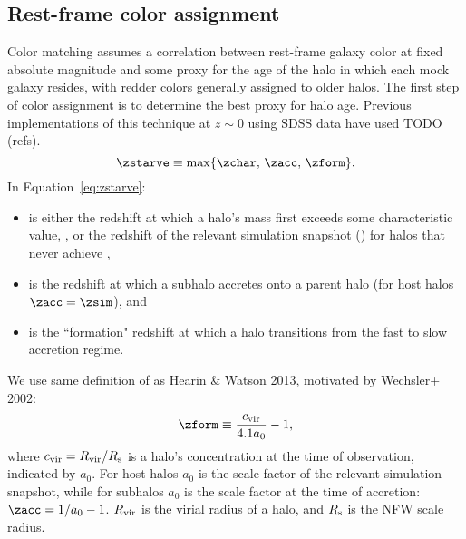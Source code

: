 \documentclass[twocolumn,apj,iop,tighten]{emulateapj2}
\begin{document}
\subsection{Rest-frame color assignment}\label{subsec:color_assign}

Color matching assumes a correlation between rest-frame galaxy color at fixed absolute magnitude and some proxy for the age of the halo in which each mock galaxy resides, with redder colors generally assigned to older halos. The first step of color assignment is to determine the best proxy for halo age. Previous implementations of this technique at $z\sim0$ using SDSS data have used TODO (refs).
%
\begin{equation}\label{eq:zstarve}
\zstarve \equiv \max\{\zchar,\, \zacc,\, \zform\}.
\end{equation}
%
\noindent In Equation~\ref{eq:zstarve}:

\begin{itemize}
\item \zchar is either the redshift at which a halo's mass first exceeds some characteristic value, \mchar, or the redshift of the relevant simulation snapshot (\zsim) for halos that never achieve \mchar,
%
\item \zacc is the redshift at which a subhalo accretes onto a parent halo (for host halos ${\zacc=\zsim}$), and
%
\item \zform is the ``formation" redshift at which a halo transitions from the fast to slow accretion regime.
\end{itemize}
\noindent We use same definition of \zform as Hearin \& Watson 2013, motivated by Wechsler+ 2002:
%
\begin{equation}\label{eq:zform}
\zform \equiv \frac{c_{\rm vir}}{4.1 a_0} - 1,
\end{equation}
%
\noindent where ${c_{\rm vir} = R_{\rm vir}/R_{\rm s}}$ is a halo's concentration at the time of observation, indicated by $a_0$. For host halos $a_0$ is the scale factor of the relevant simulation snapshot, while for subhalos $a_0$ is the scale factor at the time of accretion: ${\zacc = 1/{a_0} - 1}$. $R_{\rm vir}$ is the virial radius of a halo, and $R_{\rm s}$ is the NFW scale radius.
\end{document}
